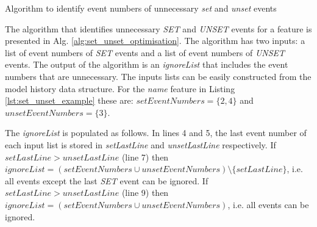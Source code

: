 \documentclass{llncs}
\begin{document}

\begin{algorithm}[H]
\begin{small}
\end{small}
\caption{Algorithm to identify event numbers of unnecessary \emph{set} and \emph{unset} events}
\label{alg:set_unset_optimisation}
\end{algorithm}

The algorithm that identifies unnecessary \emph{SET} and \emph{UNSET} events for a feature is presented in Alg. \ref{alg:set_unset_optimisation}.
The algorithm has two inputs: a list of event numbers of \emph{SET} events and a list of event numbers of \emph{UNSET} events.
The output of the algorithm is an \emph{ignoreList} that includes the event numbers that are unnecessary.
The inputs lists can be easily constructed from the model history data structure.
For the \emph{name} feature in Listing \ref{lst:set_unset_example} these are: $setEventNumbers = \{2,4\}$ and $unsetEventNumbers = \{3\}$.

The \emph{ignoreList} is populated as follows.
In lines 4 and 5, the last event number of each input list is stored in \emph{setLastLine} and \emph{unsetLastLine} respectively.
If $setLastLine > unsetLastLine$ (line 7) then $ignoreList = (setEventNumbers \cup unsetEventNumbers) \setminus  \{setLastLine\} $, i.e. all events except the last \emph{SET} event can be ignored.
If $setLastLine > unsetLastLine$ (line 9) then $ignoreList = (setEventNumbers \cup unsetEventNumbers)$, i.e. all events can be ignored.
\end{document}
